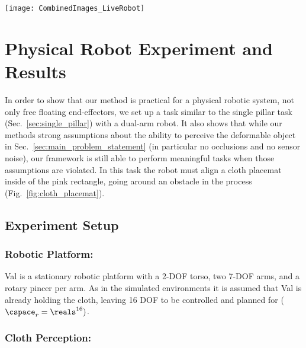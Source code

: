 
\begin{figure*}[ht]
    \centering
    \texttt{[image: CombinedImages\_LiveRobot]}
    \vspace{-1.7in}
    \caption{Cloth placemat task. The placemat starts on the far side of an obstacle and must be aligned with the pink rectangle near the robot.}
    \label{fig:cloth_placemat}
\end{figure*}



\section{Physical Robot Experiment and Results}
\label{sec:live_robot}

In order to show that our method is practical for a physical robotic system, not only free floating end-effectors, we set up a task similar to the single pillar task (Sec.~\ref{sec:single_pillar}) with a dual-arm robot. It also shows that while our methods strong assumptions about the ability to perceive the deformable object in Sec.~\ref{sec:main_problem_statement} (in particular no occlusions and no sensor noise), our framework is still able to perform meaningful tasks when those assumptions are violated. In this task the robot must align a cloth placemat inside of the pink rectangle, going around an obstacle in the process (Fig.~\ref{fig:cloth_placemat}).






\subsection{Experiment Setup}

\subsubsection{Robotic Platform:}
Val is a stationary robotic platform with a 2-DOF torso, two 7-DOF arms, and a rotary pincer per arm. As in the simulated environments it is assumed that Val is already holding the cloth, leaving 16 DOF to be controlled and planned for ($\cspace_r = \reals^{16})$.





\subsubsection{Cloth Perception:}
\label{sec:cloth_perception}



